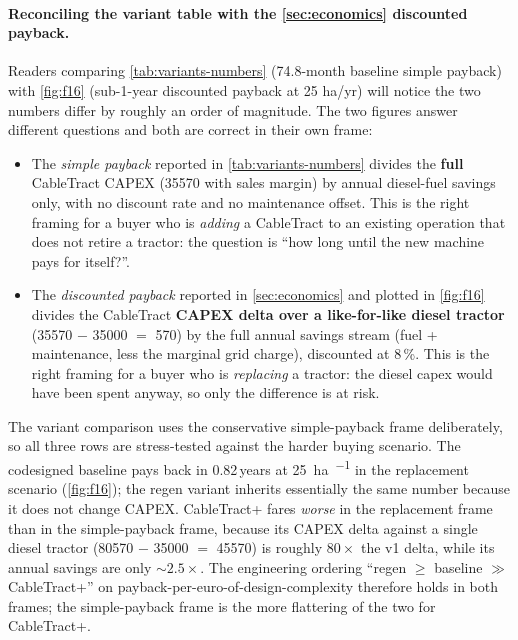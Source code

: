 \documentclass[11pt,a4paper]{article}
\begin{document}
\paragraph{Reconciling the variant table with the \cref{sec:economics} discounted payback.} Readers comparing \cref{tab:variants-numbers} (74.8-month baseline simple payback) with \cref{fig:f16} (sub-1-year discounted payback at 25 ha/yr) will notice the two numbers differ by roughly an order of magnitude. The two figures answer different questions and both are correct in their own frame:
\begin{itemize}[leftmargin=1.6em,itemsep=0.15em]
    \item The \emph{simple payback} reported in \cref{tab:variants-numbers} divides the \textbf{full} CableTract CAPEX (\SI{35570}{\EUR} with sales margin) by annual diesel-fuel savings only, with no discount rate and no maintenance offset. This is the right framing for a buyer who is \emph{adding} a CableTract to an existing operation that does not retire a tractor: the question is ``how long until the new machine pays for itself?''.
    \item The \emph{discounted payback} reported in \cref{sec:economics} and plotted in \cref{fig:f16} divides the CableTract \textbf{CAPEX delta over a like-for-like diesel tractor} (\SI{35570}{\EUR} $-$ \SI{35000}{\EUR} $=$ \SI{570}{\EUR}) by the full annual savings stream (fuel + maintenance, less the marginal grid charge), discounted at 8\,\%. This is the right framing for a buyer who is \emph{replacing} a tractor: the diesel capex would have been spent anyway, so only the difference is at risk.
\end{itemize}
The variant comparison uses the conservative simple-payback frame deliberately, so all three rows are stress-tested against the harder buying scenario. The codesigned baseline pays back in 0.82\,years at \SI{25}{\hectare\per\year} in the replacement scenario (\cref{fig:f16}); the regen variant inherits essentially the same number because it does not change CAPEX. CableTract+ fares \emph{worse} in the replacement frame than in the simple-payback frame, because its CAPEX delta against a single diesel tractor (\SI{80570}{\EUR} $-$ \SI{35000}{\EUR} $=$ \SI{45570}{\EUR}) is roughly $80\times$ the v1 delta, while its annual savings are only ${\sim}2.5\times$. The engineering ordering ``regen $\geq$ baseline $\gg$ CableTract+'' on payback-per-euro-of-design-complexity therefore holds in both frames; the simple-payback frame is the more flattering of the two for CableTract+.
\end{document}
